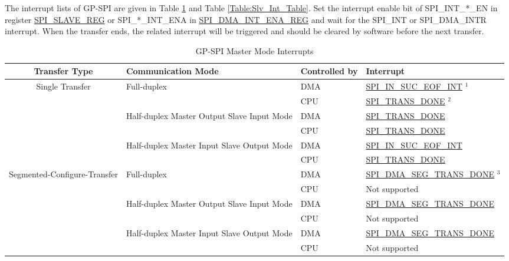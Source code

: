 \documentclass[main\_\_EN.tex]{subfiles}
\begin{document}
The interrupt lists of GP-SPI are given in Table \ref{Table:Mst_Int_Table} and Table  \ref {Table:Slv_Int_Table}. Set the interrupt enable bit of SPI\_INT\_*\_EN in register \hyperref[regdesc:SPISLAVEREG]{SPI\_SLAVE\_REG} or SPI\_*\_INT\_ENA in \hyperref[regdesc:SPIDMAINTENAREG]{SPI\_DMA\_INT\_ENA\_REG} and wait for the SPI\_INT or SPI\_DMA\_INTR interrupt. When the transfer ends, the related interrupt will be triggered and should be cleared by software before the next transfer.

\begin{landscape}
\begin{longtable}[c]{|c|l|l|l|}
\caption{GP-SPI Master Mode Interrupts}
\label{Table:Mst_Int_Table}\\
\hline
\rowcolor{lightgray}
Transfer Type  & Communication Mode & Controlled by & Interrupt \\ \hline
\endhead
\multirow{6}{*}{Single Transfer} & \multirow{2}{*}{Full-duplex} & DMA & \hyperref[int:SPIINSUCEOFINT]{SPI\_IN\_SUC\_EOF\_INT} \hyperref[spi-note1]{$^1$} \\ \cline{3-4}
&& CPU & \hyperref[fielddesc:SPITRANSDONE]{SPI\_TRANS\_DONE} \hyperref[spi-note2]{$^2$}  \\ \cline{2-4}
& \multirow{2}{*}{Half-duplex Master Output Slave Input Mode} & DMA & \hyperref[fielddesc:SPITRANSDONE]{SPI\_TRANS\_DONE} \\ \cline{3-4}
&& CPU & \hyperref[fielddesc:SPITRANSDONE]{SPI\_TRANS\_DONE}  \\ \cline{2-4}
& \multirow{2}{*}{Half-duplex Master Input Slave Output Mode} & DMA & \hyperref[int:SPIINSUCEOFINT]{SPI\_IN\_SUC\_EOF\_INT} \\ \cline{3-4}
&& CPU & \hyperref[fielddesc:SPITRANSDONE]{SPI\_TRANS\_DONE} \\ \hline
\multirow{6}{*}{Segmented-Configure-Transfer} & \multirow{2}{*}{Full-duplex} & DMA & \hyperref[fielddesc:SPIDMASEGTRANSDONE]{SPI\_DMA\_SEG\_TRANS\_DONE} \hyperref[note3]{$^3$} \\ \cline{3-4}
&& CPU & Not supported       \\ \cline{2-4}
& \multirow{2}{*}{Half-duplex Master Output Slave Input Mode} & DMA  & \hyperref[fielddesc:SPIDMASEGTRANSDONE]{SPI\_DMA\_SEG\_TRANS\_DONE} \\ \cline{3-4}
&& CPU           & Not supported       \\ \cline{2-4}
& \multirow{2}{*}{Half-duplex Master Input Slave Output Mode} & DMA & \hyperref[fielddesc:SPIDMASEGTRANSDONE]{SPI\_DMA\_SEG\_TRANS\_DONE} \\ \cline{3-4}
&& CPU & Not supported       \\ \hline
\end{longtable}


\end{landscape}
\end{document}

